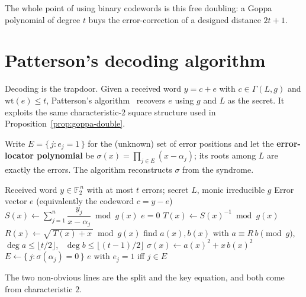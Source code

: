 The whole point of using binary codewords is this free doubling: a Goppa polynomial of degree $t$ buys the error-correction of a designed distance $2t+1$.

\section{Patterson's decoding algorithm}

Decoding is the trapdoor. Given a received word $y=c+e$ with $c\in\Gamma(L,g)$ and $\mathrm{wt}(e)\le t$, Patterson's algorithm~\cite{patterson1975} recovers $e$ using $g$ and $L$ as the secret. It exploits the same characteristic-$2$ square structure used in Proposition~\ref{prop:goppa-double}.

Write $E=\{\,j: e_j=1\,\}$ for the (unknown) set of error positions and let the \textbf{error-locator polynomial} be $\sigma(x)=\prod_{j\in E}(x-\alpha_j)$; its roots among $L$ are exactly the errors. The algorithm reconstructs $\sigma$ from the syndrome.

\begin{algorithm}[H]
\caption{Patterson decoding of a binary Goppa code $\Gamma(L,g)$ with monic irreducible $g$, $\deg g=t$}
\label{alg:patterson}
\begin{algorithmic}[1]
\Require Received word $y\in\mathbb{F}_2^{\,n}$ with at most $t$ errors; secret $L$, monic irreducible $g$
\Ensure Error vector $e$ (equivalently the codeword $c=y-e$)
\State $S(x) \gets \sum_{j=1}^{n} \dfrac{y_j}{x-\alpha_j} \bmod g(x)$ 
 \State \Return $e=0$  \EndIf
\State $T(x) \gets S(x)^{-1} \bmod g(x)$
\State $R(x) \gets \sqrt{\,T(x)+x\,} \bmod g(x)$ 
\State find $a(x),b(x)$ with $a \equiv R\,b \pmod{g}$, \ $\deg a\le\lfloor t/2\rfloor$, \ $\deg b\le\lfloor (t-1)/2\rfloor$
\Statex \hfill{}
\State $\sigma(x) \gets a(x)^2 + x\,b(x)^2$ 
\State $E \gets \{\, j : \sigma(\alpha_j)=0 \,\}$ 
\State \Return $e$ with $e_j=1$ iff $j\in E$
\end{algorithmic}
\end{algorithm}

The two non-obvious lines are the split and the key equation, and both come from characteristic $2$.

